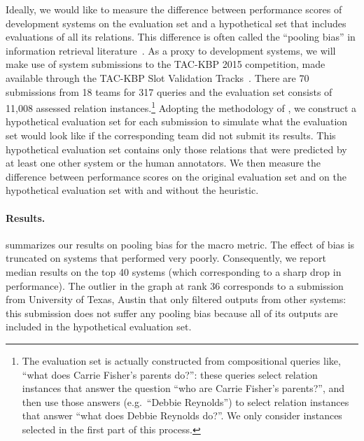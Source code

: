 Ideally, we would like to measure the difference between performance scores of development systems on the evaluation set and a hypothetical set that includes evaluations of all its relations.
This difference is often called the ``pooling bias'' in information retrieval literature~\citep{}. %
As a proxy to development systems, we will make use of system submissions to the TAC-KBP 2015 competition, made available through the TAC-KBP Slot Validation Tracks~\citep{}.
There are 70 submissions from 18 teams for 317 queries and the evaluation set consists of 11,008 assessed relation instances.\footnote{%
  The evaluation set is actually constructed from compositional queries like, ``what does Carrie Fisher's parents do?'':
  these queries select relation instances that answer the question ``who are Carrie Fisher's parents?'', and then use those answers (e.g.\ ``Debbie Reynolds'') to select relation instances that answer ``what does Debbie Reynolds do?''.
  We only consider instances selected in the first part of this process.
}
Adopting the methodology of \citet{weber2010measurement},
we construct a hypothetical evaluation set for each submission to simulate what the evaluation set would look like if the corresponding team did not submit its results.
This hypothetical evaluation set contains only those relations that were predicted by at least one other system or the human annotators.
We then measure the difference between performance scores on the original evaluation set and on the hypothetical evaluation set with and without the \anydoc{} heuristic. 

\paragraph{Results.}
 summarizes our results on pooling bias for the macro \fone{} metric.
The effect of bias is truncated on systems that performed very poorly.
Consequently, we report median results on the top 40 systems (which corresponding to a sharp drop in performance).
The outlier in the graph at rank 36 corresponds to a submission from University of Texas, Austin that only filtered outputs from other systems: this submission does not suffer any pooling bias because all of its outputs are included in the hypothetical evaluation set.

